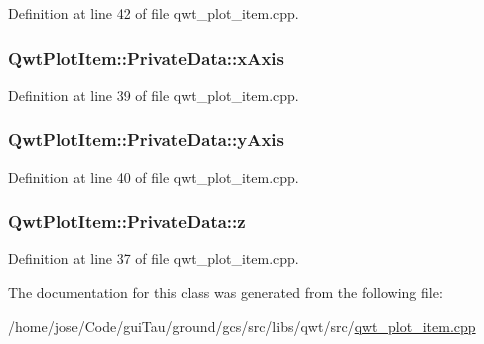 Definition at line 42 of file qwt\-\_\-plot\-\_\-item.\-cpp.

\hypertarget{class_qwt_plot_item_1_1_private_data_a68ccdb96a8badd93f84502901bfce02e}{
\subsubsection[{x\-Axis}]{ Qwt\-Plot\-Item\-::\-Private\-Data\-::x\-Axis}}\label{class_qwt_plot_item_1_1_private_data_a68ccdb96a8badd93f84502901bfce02e}


Definition at line 39 of file qwt\-\_\-plot\-\_\-item.\-cpp.

\hypertarget{class_qwt_plot_item_1_1_private_data_ac7c87771570f493ac963b211bf46646c}{
\subsubsection[{y\-Axis}]{ Qwt\-Plot\-Item\-::\-Private\-Data\-::y\-Axis}}\label{class_qwt_plot_item_1_1_private_data_ac7c87771570f493ac963b211bf46646c}


Definition at line 40 of file qwt\-\_\-plot\-\_\-item.\-cpp.

\hypertarget{class_qwt_plot_item_1_1_private_data_a65da18c22bd4ccc2c5eedf4bbc8b57dc}{
\subsubsection[{z}]{ Qwt\-Plot\-Item\-::\-Private\-Data\-::z}}\label{class_qwt_plot_item_1_1_private_data_a65da18c22bd4ccc2c5eedf4bbc8b57dc}


Definition at line 37 of file qwt\-\_\-plot\-\_\-item.\-cpp.



The documentation for this class was generated from the following file\-:\begin{DoxyCompactItemize}
\item 
/home/jose/\-Code/gui\-Tau/ground/gcs/src/libs/qwt/src/\hyperlink{qwt__plot__item_8cpp}{qwt\-\_\-plot\-\_\-item.\-cpp}\end{DoxyCompactItemize}

